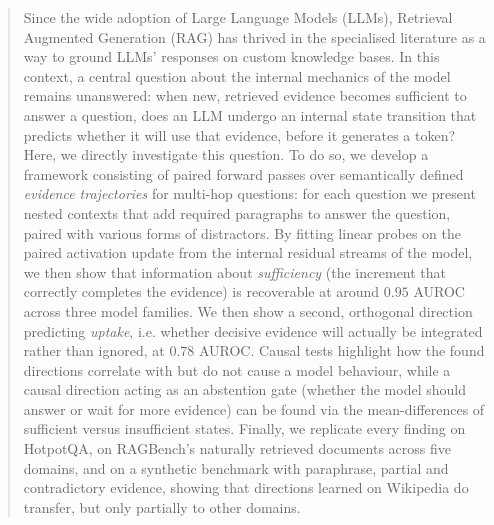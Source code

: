 \begin{abstract}
Since the wide adoption of Large Language Models (LLMs), Retrieval Augmented Generation (RAG) has thrived in the specialised literature as a way to ground LLMs' responses on custom knowledge bases. In this context, a central question about the internal mechanics of the model remains unanswered: when new, retrieved evidence becomes sufficient to answer a question, does an LLM undergo an internal state transition that predicts whether it will use that evidence, before it generates a token? Here, we directly investigate this question. To do so, we develop a framework consisting of paired forward passes over semantically defined \emph{evidence trajectories} for multi-hop questions: for each question we present nested contexts that add required paragraphs to answer the question, paired with various forms of distractors. By fitting linear probes on the paired activation update from the internal residual streams of the model, we then show that information about \emph{sufficiency} (the increment that correctly completes the evidence) is recoverable at around $0.95$ AUROC across three model families. We then show a second, orthogonal direction predicting \emph{uptake}, i.e. whether decisive evidence will actually be integrated rather than ignored, at $0.78$ AUROC. Causal tests highlight how the found directions correlate with but do not cause a model behaviour, while a causal direction acting as an abstention gate (whether the model should answer or wait for more evidence) can be found via the mean-differences of sufficient versus insufficient states.
Finally, we replicate every finding on HotpotQA, on RAGBench's naturally retrieved documents across five domains, and on a synthetic benchmark with paraphrase, partial and contradictory evidence, showing that directions learned on Wikipedia do transfer, but only partially to other domains.
\end{abstract}
